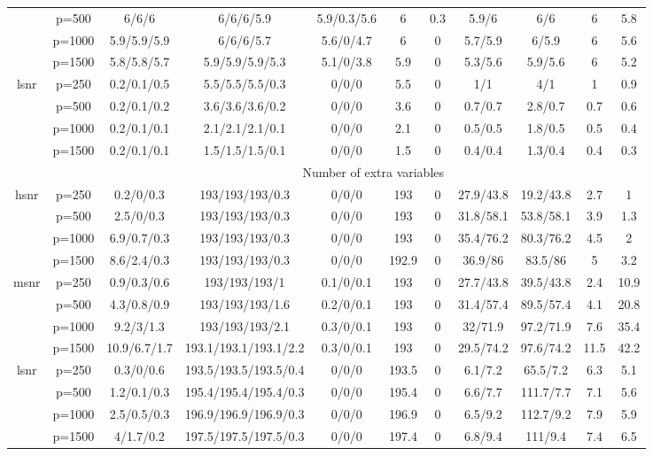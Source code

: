 \begin{table}[ht]
{\begin{tabular}{|c|c|ccccccccc|}
   & p=500 & 6/6/6 & 6/6/6/5.9 & 5.9/0.3/5.6 & 6 & 0.3 & 5.9/6 & 6/6 & 6 & 5.8 \\ 
   & p=1000 & 5.9/5.9/5.9 & 6/6/6/5.7 & 5.6/0/4.7 & 6 & 0 & 5.7/5.9 & 6/5.9 & 6 & 5.6 \\ 
   & p=1500 & 5.8/5.8/5.7 & 5.9/5.9/5.9/5.3 & 5.1/0/3.8 & 5.9 & 0 & 5.3/5.6 & 5.9/5.6 & 6 & 5.2 \\ 
  \midrule\multirow{4}[2]{*}{lsnr} & p=250 & 0.2/0.1/0.5 & 5.5/5.5/5.5/0.3 & 0/0/0 & 5.5 & 0 & 1/1 & 4/1 & 1 & 0.9 \\ 
   & p=500 & 0.2/0.1/0.2 & 3.6/3.6/3.6/0.2 & 0/0/0 & 3.6 & 0 & 0.7/0.7 & 2.8/0.7 & 0.7 & 0.6 \\ 
   & p=1000 & 0.2/0.1/0.1 & 2.1/2.1/2.1/0.1 & 0/0/0 & 2.1 & 0 & 0.5/0.5 & 1.8/0.5 & 0.5 & 0.4 \\ 
   & p=1500 & 0.2/0.1/0.1 & 1.5/1.5/1.5/0.1 & 0/0/0 & 1.5 & 0 & 0.4/0.4 & 1.3/0.4 & 0.4 & 0.3 \\ 
   \midrule 
 \multicolumn{1}{|c}{} &       & \multicolumn{9}{c|}{Number of extra variables} \\
\midrule\multirow{4}[2]{*}{hsnr} & p=250 & 0.2/0/0.3 & 193/193/193/0.3 & 0/0/0 & 193 & 0 & 27.9/43.8 & 19.2/43.8 & 2.7 & 1 \\ 
   & p=500 & 2.5/0/0.3 & 193/193/193/0.3 & 0/0/0 & 193 & 0 & 31.8/58.1 & 53.8/58.1 & 3.9 & 1.3 \\ 
   & p=1000 & 6.9/0.7/0.3 & 193/193/193/0.3 & 0/0/0 & 193 & 0 & 35.4/76.2 & 80.3/76.2 & 4.5 & 2 \\ 
   & p=1500 & 8.6/2.4/0.3 & 193/193/193/0.3 & 0/0/0 & 192.9 & 0 & 36.9/86 & 83.5/86 & 5 & 3.2 \\ 
  \midrule\multirow{4}[2]{*}{msnr} & p=250 & 0.9/0.3/0.6 & 193/193/193/1 & 0.1/0/0.1 & 193 & 0 & 27.7/43.8 & 39.5/43.8 & 2.4 & 10.9 \\ 
   & p=500 & 4.3/0.8/0.9 & 193/193/193/1.6 & 0.2/0/0.1 & 193 & 0 & 31.4/57.4 & 89.5/57.4 & 4.1 & 20.8 \\ 
   & p=1000 & 9.2/3/1.3 & 193/193/193/2.1 & 0.3/0/0.1 & 193 & 0 & 32/71.9 & 97.2/71.9 & 7.6 & 35.4 \\ 
   & p=1500 & 10.9/6.7/1.7 & 193.1/193.1/193.1/2.2 & 0.3/0/0.1 & 193 & 0 & 29.5/74.2 & 97.6/74.2 & 11.5 & 42.2 \\ 
  \midrule\multirow{4}[2]{*}{lsnr} & p=250 & 0.3/0/0.6 & 193.5/193.5/193.5/0.4 & 0/0/0 & 193.5 & 0 & 6.1/7.2 & 65.5/7.2 & 6.3 & 5.1 \\ 
   & p=500 & 1.2/0.1/0.3 & 195.4/195.4/195.4/0.3 & 0/0/0 & 195.4 & 0 & 6.6/7.7 & 111.7/7.7 & 7.1 & 5.6 \\ 
   & p=1000 & 2.5/0.5/0.3 & 196.9/196.9/196.9/0.3 & 0/0/0 & 196.9 & 0 & 6.5/9.2 & 112.7/9.2 & 7.9 & 5.9 \\ 
   & p=1500 & 4/1.7/0.2 & 197.5/197.5/197.5/0.3 & 0/0/0 & 197.4 & 0 & 6.8/9.4 & 111/9.4 & 7.4 & 6.5 \\ 
   \bottomrule 
\end{tabular}
}
\end{table}
